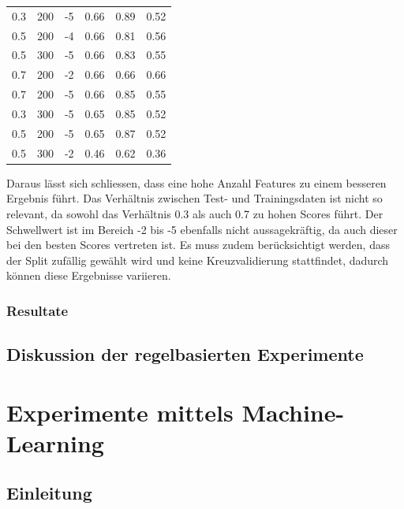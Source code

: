 \begin{table}
\begin{tabular}{ | l | l | l | l | l | l | }
		0.3 & 200 & -5 & 0.66 & 0.89 & 0.52 \\ 
		0.5 & 200 & -4 & 0.66 & 0.81 & 0.56 \\
		0.5 & 300 & -5 & 0.66 & 0.83 & 0.55 \\ 
		0.7 & 200 & -2 & 0.66 & 0.66 & 0.66 \\ 
		0.7 & 200 & -5 & 0.66 & 0.85 & 0.55 \\ 
		0.3 & 300 & -5 & 0.65 & 0.85 & 0.52 \\ 
		0.5 & 200 & -5 & 0.65 & 0.87 & 0.52 \\
		0.5 & 300 & -2 & 0.46 & 0.62 & 0.36 \\ \hline
	\end{tabular}
\end{table}
Daraus lässt sich schliessen, dass eine hohe Anzahl Features zu einem besseren Ergebnis führt.
Das Verhältnis zwischen Test- und Trainingsdaten ist nicht so relevant, da sowohl das Verhältnis 0.3 als auch 0.7 zu hohen Scores führt.
Der Schwellwert ist im Bereich -2 bis -5 ebenfalls nicht aussagekräftig, da auch dieser bei den besten Scores vertreten ist.
Es muss zudem berücksichtigt werden, dass der Split zufällig gewählt wird und keine Kreuzvalidierung stattfindet, dadurch können diese Ergebnisse variieren.
\FloatBarrier
\subsubsection{Resultate}
\subsection{Diskussion der regelbasierten Experimente}
\section{Experimente mittels Machine-Learning}
\subsection{Einleitung}
